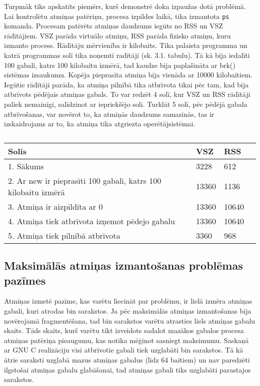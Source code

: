 Turpmāk tiks apskatīts piemērs, kurš demonstrē doka izpaužas dotā problēmā.
Lai kontrolētu atmiņas patēriņu, procesa izpildes laikā, tika izmantota \texttt{ps} komanda.
Procesam patērēts atmiņas daudzums iegūts no RSS un VSZ rādītājiem.
VSZ parāda virtuālo atmiņu, RSS parāda fizisko atmiņu, kuru izmanto process.
Rādītāju mērvienība ir kilobaits.
Tika palaista programma un katrā programmas solī tika noņemti radītāji (sk. 3.1. tabulu).
Tā kā bija iedalīti 100 gabali, katrs 100 kilobaitu izmērā, tad kaudze bija paplašināta ar brk() sistēmas izsaukumu.
Kopēja pieprasīta atmiņa bija vienāda ar 10000 kilobaitiem.
Iegūtie rādītāji parāda, ka atmiņa pilnībā tika atbrīvota tikai pēc tam, kad bija atbrīvots pēdējais atmiņas gabals.
To var redzēt 4 solī, kur VSZ un RSS rādītāji paliek nemainīgi, salīdzinot ar iepriekšējo soli.
Turklāt 5 solī, pēc pēdējā gabala atbrīvošanas, var novērot to, ka atmiņās daudzums samazinās, tas ir izskaidrojams ar to, ka atmiņa tika atgriezta operētājsistēmai.


\begin{table}[H]
\caption{\textbf{\fontsize{11}{12}\selectfont {Programmas RSS un VSZ radītāji}}}
\label{table:kysymys}
\centering
	\begin{tabular}{|l|l|l|p{5cm}|}
	  \hline
	Solis & VSZ & RSS \\
    \hline
    1. Sākums & 3228 & 612 \\
	\hline
	 2. Ar new ir pieprasīti 100 gabali, katrs 100 kilobaitu izmērā  & 13360  & 1136 \\
      \hline
     3. Atmiņa ir aizpildīta ar 0 &  13360 & 10640\\
      \hline
     4. Atmiņa tiek atbrīvota izņemot pēdejo gabalu & 13360 & 10640 \\
      \hline
     5. Atmiņa tiek pilnībā atbrīvota & 3360 & 968 \\
    \hline
	\end{tabular}
\end{table}

\subsection{Maksimālās atmiņas izmantošanas problēmas pazīmes}



Atmiņas izmetē pazīme, kas varētu liecināt par problēmu, ir lielā izmēra atmiņas gabali, kuri atrodas bin sarakstos.
Ja pēc maksimālās atmiņas izmantošanas bija novērojamā fragmentēšana, tad bin sarakstos varētu atrasties liels atmiņas gabalu skaits.
Tāds skaits, kurš varētu tikt izveidots sadalot mazākos gabalos procesa atmiņas patēriņa pieaugumu, kas notika mēģinot sasniegt maksimumu.
Saskaņā ar GNU C realizāciju visi atbrīvotie gabali tiek uzglabāti bin sarakstos.
Tā kā ātrie saraksti uzglabā mazus atmiņas gabalus (līdz 64 baitiem) un nav paredzēti ilgstošai atmiņas gabalu glabāšanai, tad atmiņas gabali tiks uzglabāti parastajos sarakstos.

